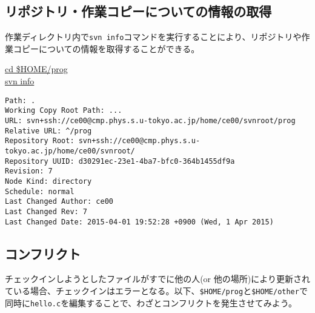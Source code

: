 \subsection{リポジトリ・作業コピーについての情報の取得}

作業ディレクトリ内で{\tt svn info}コマンドを実行することにより、リポジトリや作業コピーについての情報を取得することができる。
\begin{commandline2}
\prompt \underline{cd \$HOME/prog} \\
\prompt \underline{svn info}
\vspace*{-.7em} 
\begin{verbatim}
Path: .
Working Copy Root Path: ...
URL: svn+ssh://ce00@cmp.phys.s.u-tokyo.ac.jp/home/ce00/svnroot/prog
Relative URL: ^/prog
Repository Root: svn+ssh://ce00@cmp.phys.s.u-tokyo.ac.jp/home/ce00/svnroot/
Repository UUID: d30291ec-23e1-4ba7-bfc0-364b1455df9a
Revision: 7
Node Kind: directory
Schedule: normal
Last Changed Author: ce00
Last Changed Rev: 7
Last Changed Date: 2015-04-01 19:52:28 +0900 (Wed, 1 Apr 2015)
\end{verbatim}
\end{commandline2} \noindent

\subsection{コンフリクト}

チェックインしようとしたファイルがすでに他の人(or 他の場所)により更新されている場合、チェックインはエラーとなる。以下、{\tt \$HOME/prog}と{\tt \$HOME/other}で同時に{\tt hello.c}を編集することで、わざとコンフリクトを発生させてみよう。

